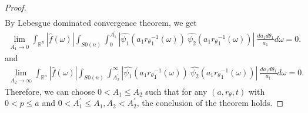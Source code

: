 \documentclass[11pt,reqno]{amsart}
\numberwithin{equation}{section}
\theoremstyle{definition}
\begin{document}
\begin{proof}
\begin{align*}
\end{align*}
By Lebesgue dominated convergence theorem, we get
\begin{align*}
\lim\limits_{A_1^{'} \to 0} \int_{\mathbb{R}^n}|\widehat{f}(\omega)|\int_{S0(n)}\int_{0}^{A_1^{'}} |\widehat{\psi_{1}}(a_1{r_\theta}_1^{-1}(\omega))\ \widehat{\psi_2}(a_1 {r_{\theta}}_1^{-1}(\omega))|\ \frac{da_1d\theta_1}{a_1}d\omega = 0. 
\end{align*}
and
\begin{align*}
\lim\limits_{A_2^{'} \to \infty} \int_{\mathbb{R}^n}|\widehat{f}(\omega)|\int_{S0(n)}\int_{A_2^{'}}^{\infty} |\widehat{\psi_{1}}(a_1{r_\theta}_1^{-1}(\omega))\ \widehat{\psi_2}(a_1 {r_{\theta}}_1^{-1}(\omega))|\ \frac{da_1d\theta_1}{a_1}d\omega = 0. 
\end{align*}
Therefore, we can choose  $0 < A_1\leq A_2$ such that for any $(a,r_{\theta},t)$ with $0< p\leq a$ and  $0< A_1^{'}\leq A_1, A_2<A_2^{'}$, the conclusion of the theorem holds.
\end{proof}
\end{document}
